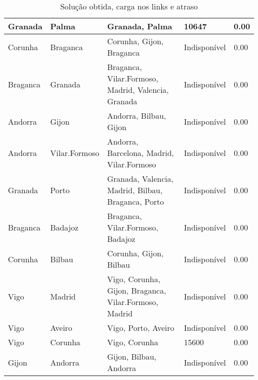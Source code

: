 \begin{table}[!htb]
{\begin{tabular}{|l|l|l|l|l|}
Granada & Palma & Granada, Palma & 10647 & 0.00 \\ \hline
Corunha & Braganca & Corunha, Gijon, Braganca & Indisponível & 0.00 \\ \hline
Braganca & Granada & Braganca, Vilar.Formoso, Madrid, Valencia, Granada & Indisponível & 0.00 \\ \hline
Andorra & Gijon & Andorra, Bilbau, Gijon & Indisponível & 0.00 \\ \hline
Andorra & Vilar.Formoso & Andorra, Barcelona, Madrid, Vilar.Formoso & Indisponível & 0.00 \\ \hline
Granada & Porto & Granada, Valencia, Madrid, Bilbau, Braganca, Porto & Indisponível & 0.00 \\ \hline
Braganca & Badajoz & Braganca, Vilar.Formoso, Badajoz & Indisponível & 0.00 \\ \hline
Corunha & Bilbau & Corunha, Gijon, Bilbau & Indisponível & 0.00 \\ \hline
Vigo & Madrid & Vigo, Corunha, Gijon, Braganca, Vilar.Formoso, Madrid & Indisponível & 0.00 \\ \hline
Vigo & Aveiro & Vigo, Porto, Aveiro & Indisponível & 0.00 \\ \hline
Vigo & Corunha & Vigo, Corunha & 15600 & 0.00 \\ \hline
Gijon & Andorra & Gijon, Bilbau, Andorra & Indisponível & 0.00 \\ \hline
\end{tabular}}
\caption[]{Solução obtida, carga nos links e atraso}
\end{table}

